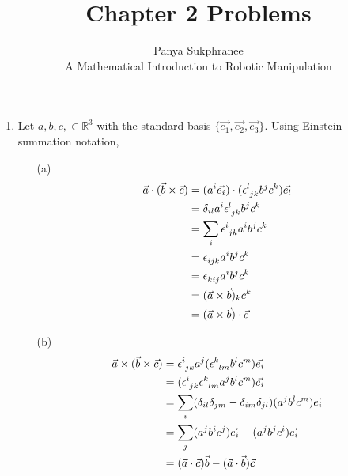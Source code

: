 \documentclass[12pt]{article}
\newcommand{\levicivita}{}%
\def\levicivita#1#{\tensor#1{\epsilon}}
\newcommand{\R}{\mathbb{R}}
\begin{document}
 
 
\title{Chapter 2 Problems}
\author{Panya Sukphranee\\ %
A Mathematical Introduction to Robotic Manipulation}
\date{}
\maketitle

    \begin{enumerate}
        \item Let $ a,b,c, \in \R^3 $ with the standard basis $\{ \vec{e_1}, \vec{e_2}, \vec{e_3} \}$. Using Einstein summation notation, \\
            \begin{enumerate}
                \item[(a)] \\
                    \begin{align}
                        \vec{a} \cdot (\vec{b} \times \vec{c}) &= (a^i \vec{e_i}) \cdot (\levicivita{^{l}_{jk}}b^jc^k) \vec{e_l} \\
                                                    &= \delta_{il} a^i \levicivita{^{l}_{jk}}b^jc^k \\
                                                    &= \sum_i \levicivita{^{i}_{jk}}a^i b^j c^k \\
                                                    &= \levicivita{_{ijk}}a^i b^j c^k \\
                                                    &= \levicivita{_{kij}}a^i b^j c^k \\
                                                    &= (\vec{a} \times \vec{b})_k c^k \\
                                                    &= (\vec{a} \times \vec{b}) \cdot \vec{c} 
                    \end{align}
                \item[(b)]
                    \begin{align}
                        \vec{a} \times (\vec{b} \times \vec{c}) &= \levicivita{^{i}_{jk}}a^j(\levicivita{^{k}_{lm}}b^l c^m) \vec{e_i} \\
                                                    &= (\levicivita{^{i}_{jk}}\levicivita{^{k}_{lm}} a^j b^l c^m) \vec{e_i} \\
                                                    &= \sum_i (\delta_{il}\delta_{jm} - \delta_{im}\delta_{jl})(a^j b^l c^m) \vec{e_i}\\
                                                    &= \sum_j (a^j b^i c^j)\vec{e_i} - (a^j b^j c^i)\vec{e_i}\\
                                                    &= (\vec{a} \cdot \vec{c})\vec{b} - (\vec{a} \cdot \vec{b})\vec{c}
                    \end{align}
            \end{enumerate}
            

\end{enumerate}
\end{document}
